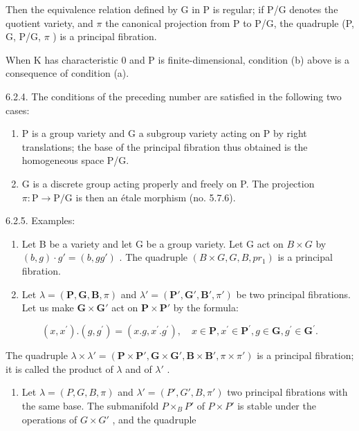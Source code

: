 Then the equivalence relation defined by G in P is regular; if P/G denotes the quotient variety, and \(\pi\) the canonical projection from P to P/G, the quadruple (P, G, P/G, \(\pi\) ) is a principal fibration.

When K has characteristic 0 and P is finite-dimensional, condition (b) above is a consequence of condition (a).

6.2.4. The conditions of the preceding number are satisfied in the following two cases:

\begin{enumerate}
\def\labelenumi{(\alph{enumi})}
\item
  P is a group variety and G a subgroup variety acting on P by right translations; the base of the principal fibration thus obtained is the homogeneous space P/G.
\item
  G is a discrete group acting properly and freely on P. The projection \(\pi: \mathrm{P} \to \mathrm{P} / \mathrm{G}\) is then an étale morphism (no. 5.7.6).
\end{enumerate}

6.2.5. Examples:

\begin{enumerate}
\def\labelenumi{(\alph{enumi})}
\item
  Let B be a variety and let G be a group variety. Let G act on \(B \times G\) by \((b, g) \cdot g' = (b, gg')\) . The quadruple \((B \times G, G, B, pr_{1})\) is a principal fibration.
\item
  Let \(\lambda = (\mathbf{P}, \mathbf{G}, \mathbf{B}, \pi)\) and \(\lambda' = (\mathbf{P}', \mathbf{G}', \mathbf{B}', \pi')\) be two principal fibrations. Let us make \(\mathbf{G} \times \mathbf{G}'\) act on \(\mathbf{P} \times \mathbf{P}'\) by the formula:
\end{enumerate}

\[
(x, x ^ {\prime}). (g, g ^ {\prime}) = (x. g, x ^ {\prime}. g ^ {\prime}), \quad x \in \mathbf {P}, x ^ {\prime} \in \mathbf {P} ^ {\prime}, g \in \mathbf {G}, g ^ {\prime} \in \mathbf {G} ^ {\prime}.
\]

The quadruple \(\lambda \times \lambda' = (\mathbf{P} \times \mathbf{P}', \mathbf{G} \times \mathbf{G}', \mathbf{B} \times \mathbf{B}', \pi \times \pi')\) is a principal fibration; it is called the product of \(\lambda\) and of \(\lambda'\) .

\begin{enumerate}
\def\labelenumi{(\alph{enumi})}
\setcounter{enumi}{2}
\tightlist
\item
  Let \(\lambda = (P, G, B, \pi)\) and \(\lambda' = (P', G', B, \pi')\) two principal fibrations with the same base. The submanifold \(P \times_{B} P'\) of \(P \times P'\) is stable under the operations of \(G \times G'\) , and the quadruple
\end{enumerate}


